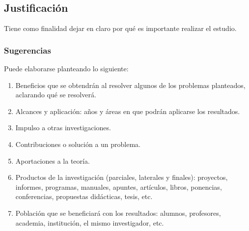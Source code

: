 \subsection{Justificación}

Tiene como finalidad dejar en claro por qué es importante realizar el estudio.

\subsubsection{Sugerencias}
Puede elaborarse planteando lo siguiente:

\begin{enumerate}[noitemsep]
 \item Beneficios que se obtendrán al resolver algunos de los problemas planteados, aclarando qué se resolverá.
 \item Alcances y aplicación: años y áreas en que podrán aplicarse los resultados.
 \item Impulso a otras investigaciones.
 \item Contribuciones o solución a un problema.
 \item Aportaciones a la teoría.
 \item Productos de la investigación (parciales, laterales y finales): proyectos, informes, programas, manuales, apuntes, artículos, libros, ponencias, conferencias, propuestas didácticas, tesis, etc.
 \item Población que se beneficiará con los resultados: alumnos, profesores, academia, institución, el mismo investigador, etc.
\end{enumerate}
